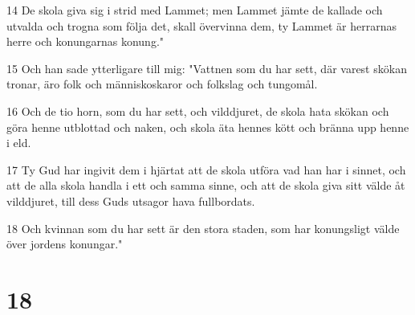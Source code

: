 \par 14 De skola giva sig i strid med Lammet; men Lammet jämte de kallade och utvalda och trogna som följa det, skall övervinna dem, ty Lammet är herrarnas herre och konungarnas konung."
\par 15 Och han sade ytterligare till mig: "Vattnen som du har sett, där varest skökan tronar, äro folk och människoskaror och folkslag och tungomål.
\par 16 Och de tio horn, som du har sett, och vilddjuret, de skola hata skökan och göra henne utblottad och naken, och skola äta hennes kött och bränna upp henne i eld.
\par 17 Ty Gud har ingivit dem i hjärtat att de skola utföra vad han har i sinnet, och att de alla skola handla i ett och samma sinne, och att de skola giva sitt välde åt vilddjuret, till dess Guds utsagor hava fullbordats.
\par 18 Och kvinnan som du har sett är den stora staden, som har konungsligt välde över jordens konungar."

\chapter{18}

